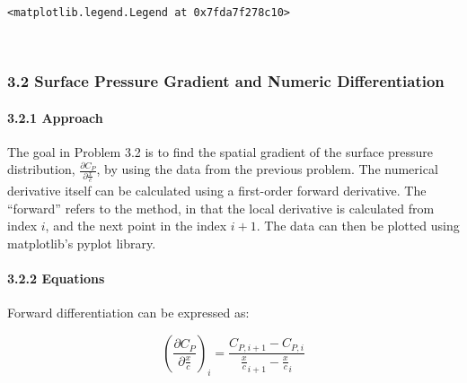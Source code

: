 \documentclass[11pt]{article}
\makeatletter
\newcommand{\boxspacing}{\kern\kvtcb@left@rule\kern\kvtcb@boxsep}
\newcommand{\prompt}[4]{
        {\ttfamily\llap{{\color{#2}[#3]:\hspace{3pt}#4}}\vspace{-\baselineskip}}
    }
\makeatother
\begin{document}
            \begin{tcolorbox}[breakable, size=fbox, boxrule=.5pt, pad at break*=1mm, opacityfill=0]
\prompt{Out}{outcolor}{6}{\boxspacing}
\begin{Verbatim}[commandchars=\\\{\}]
<matplotlib.legend.Legend at 0x7fda7f278c10>
\end{Verbatim}
\end{tcolorbox}
        
    \begin{center}
    \end{center}
    { \hspace*{\fill} \\}
    
    \hypertarget{surface-pressure-gradient-and-numeric-differentiation}{%
\subsubsection{3.2 \textbar{} Surface Pressure Gradient and Numeric
Differentiation}\label{surface-pressure-gradient-and-numeric-differentiation}}

\hypertarget{approach}{%
\paragraph{3.2.1 \textbar{} Approach}\label{approach}}

The goal in Problem 3.2 is to find the spatial gradient of the surface
pressure distribution, \(\frac{\partial C_P}{\partial \frac{x}{c}}\), by
using the data from the previous problem. The numerical derivative
itself can be calculated using a first-order forward derivative. The
``forward'' refers to the method, in that the local derivative is
calculated from index \(i\), and the next point in the index \(i+1\).
The data can then be plotted using matplotlib's pyplot library.

\hypertarget{equations}{%
\paragraph{3.2.2 \textbar{} Equations}\label{equations}}

Forward differentiation can be expressed as:

\[\begin{equation}
    (\frac{\partial C_P}{\partial \frac{x}{c}})_i = \frac{C_{P,i+1} - C_{P,i}}{\frac{x}{c}_{i+1} - \frac{x}{c}_i}
\end{equation}\]
\end{document}
